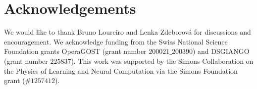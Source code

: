 \section*{Acknowledgements}

We would like to thank Bruno Loureiro and Lenka Zdeborov\'{a} for discussions and encouragement. We acknowledge funding from the Swiss National Science Foundation grants OperaGOST (grant number $200021\_200390$) and DSGIANGO (grant number $225837$). This work was supported by the Simons Collaboration on the Physics of Learning and Neural Computation via the Simons Foundation grant ($\#1257412$).





